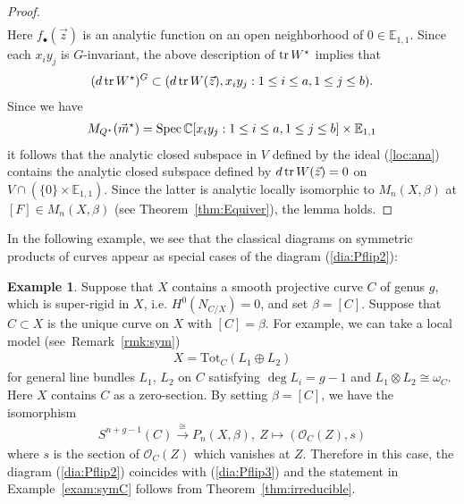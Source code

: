\documentclass[11pt]{amsart}
\theoremstyle{plain}
\theoremstyle{definition}
\newtheorem{exam}[thm]{Example}
\theoremstyle{remark}
\newcommand{\oO}{\mathcal{O}}
\newcommand{\Spec}{\mathop{\rm Spec}\nolimits}
\newcommand{\tr}{\mathop{\rm tr}\nolimits}
\begin{document}
\begin{proof}
\begin{align}
\end{align}
Here $f_{\bullet}(\vec{z})$ is an analytic function on 
an open neighborhood of $0 \in \mathbb{E}_{1, 1}$. 
Since each $x_i y_j$ is $G$-invariant, the above description of 
$\tr W^{\star}$ implies that 
\begin{align*}
(d \tr W^{\star})^G \subset (d \tr W(\vec{z}), x_i y_j : 
1\le i \le a, 1\le j \le b ).
\end{align*}
Since we have 
\begin{align*}
M_{Q^{\star}}(\vec{m}^{\star})=\Spec \mathbb{C}[x_i y_j : 1 \le i \le a, 1\le j \le b] \times \mathbb{E}_{1, 1}
\end{align*}
it follows that the analytic closed 
subspace in $V$ 
defined by the ideal (\ref{loc:ana})
contains 
the analytic closed subspace defined by 
$d \tr W(\vec{z})=0$ on 
$V \cap (\{0\} \times \mathbb{E}_{1, 1})$. 
Since the latter is analytic locally isomorphic 
to $M_n(X, \beta)$ at $[F] \in M_n(X, \beta)$
(see Theorem~\ref{thm:Equiver}), the lemma holds. 
\end{proof}


In the following example, we see that the classical 
diagrams on symmetric products of curves appear as special 
cases of the diagram (\ref{dia:Pflip2}): 
\begin{exam}\label{exam:curve}
Suppose that $X$ contains 
a smooth projective curve $C$ of genus $g$,
which is super-rigid in $X$, i.e. 
$H^0(N_{C/X})=0$, and set $\beta=[C]$. 
Suppose that $C \subset X$ is the unique curve 
on $X$
with $[C]=\beta$. 
For example, we can take a local model 
(see~Remark~\ref{rmk:sym})
\begin{align}\label{loc:X}
X=\mathrm{Tot}_C(L_1 \oplus L_2)
\end{align}
for general line bundles $L_1$, $L_2$ on $C$
satisfying $\deg L_i=g-1$ and 
$L_1 \otimes L_2 \cong \omega_C$.
Here
$X$ contains $C$ as a zero-section. 
By setting $\beta=[C]$, we have 
the isomorphism
\begin{align*}
S^{n+g-1}(C) \stackrel{\cong}{\to} P_n(X, \beta), \ 
Z \mapsto (\oO_C(Z), s)
\end{align*}
where $s$ is the section of $\oO_C(Z)$ which vanishes at $Z$. 
Therefore in this case, the diagram (\ref{dia:Pflip2}) 
coincides with (\ref{dia:Pflip3}) and the statement
in Example~\ref{exam:symC} follows from Theorem~\ref{thm:irreducible}. 
\end{exam}
\end{document}
